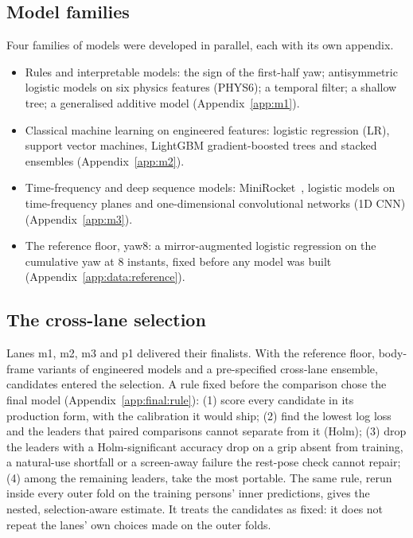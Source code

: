 \subsection{Model families}\label{sec:methods:families}
Four families of models were developed in parallel, each with its own appendix.
\begin{itemize}[nosep,leftmargin=1.5em]
  \item Rules and interpretable models: the sign of the first-half yaw; antisymmetric logistic models on six
    physics features (PHYS6); a temporal filter; a shallow tree; a generalised additive model
    (Appendix~\ref{app:m1}).
  \item Classical machine learning on  engineered features: logistic regression (LR),
    support vector machines, LightGBM gradient-boosted trees and stacked ensembles (Appendix~\ref{app:m2}).
  \item Time-frequency and deep sequence models: MiniRocket~\cite{dempster2021minirocket}, logistic models on
    time-frequency planes and one-dimensional convolutional networks (1D CNN) (Appendix~\ref{app:m3}).
  \item The reference floor, yaw8: a mirror-augmented logistic regression on the cumulative yaw at 8 instants, fixed
    before any model was built (Appendix~\ref{app:data:reference}).
\end{itemize}

\subsection{The cross-lane selection}\label{sec:methods:selection}
Lanes m1, m2, m3 and p1 delivered their finalists. With the reference floor, body-frame variants of engineered
models and a pre-specified cross-lane ensemble,  candidates entered the selection. A rule fixed
before the comparison chose the final model
(Appendix~\ref{app:final:rule}): (1) score every candidate in its production form, with the calibration it would
ship; (2) find the lowest log loss and the leaders that paired comparisons cannot separate from it (Holm); (3) drop
the leaders with a Holm-significant accuracy drop on a grip absent from training, a natural-use shortfall or a
screen-away failure the rest-pose check cannot repair; (4) among the remaining leaders, take the most
portable. The same rule, rerun inside every outer fold on the training persons' inner predictions, gives the
nested, selection-aware estimate. It treats the candidates as fixed: it does not repeat the lanes' own choices made
on the outer folds.
